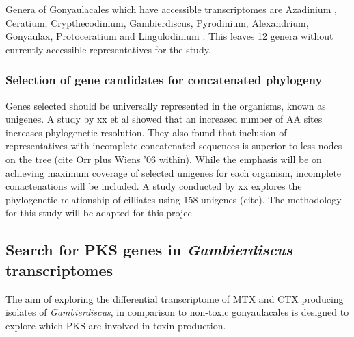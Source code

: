 \documentclass[12pt]{article}
\begin{document}
Genera of Gonyaulacales which have accessible transcriptomes are Azadinium \cite{murray2012genetic}, Ceratium, Crypthecodinium, Gambierdiscus, Pyrodinium, Alexandrium, Gonyaulax, Protoceratium and Lingulodinium \cite{kohli2015polyketide}.
This leaves 12 genera without currently accessible representatives for the study.

\subsubsection{Selection of gene candidates for concatenated phylogeny}
Genes selected should be universally represented in the organisms, known as unigenes. A study by xx et al showed that an increased number of AA sites increases phylogenetic resolution. They also found that inclusion of representatives with incomplete concatenated sequences is superior to less nodes on the tree (cite Orr plus Wiens '06 within). While the emphasis will be on achieving maximum coverage of selected unigenes for each organism, incomplete conactenations will be included.
A study conducted by xx explores the phylogenetic relationship of cilliates using 158 unigenes (cite). The methodology for this study will be adapted for this projec


\subsection{Search for PKS genes in \emph{Gambierdiscus} transcriptomes}
The aim of exploring the differential transcriptome of MTX and CTX producing isolates of \emph{Gambierdiscus}, in comparison to non-toxic gonyaulacales is designed to explore which PKS are involved in toxin production. 
\end{document}
